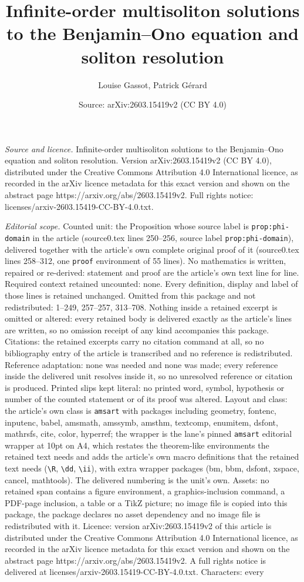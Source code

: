 \documentclass[10pt,a4paper]{amsart}
\title[Infinite-order multisoliton solutions to the Benjamin--Ono e]{Infinite-order multisoliton solutions to the Benjamin--Ono equation and soliton resolution}
\author{Louise Gassot, Patrick G\'erard}
\date{Source: arXiv:2603.15419v2 (CC BY 4.0)}
\begin{document}
\maketitle

\noindent\emph{Source and licence.} Infinite-order multisoliton solutions to the Benjamin--Ono equation and soliton resolution. Version arXiv:2603.15419v2 (CC BY 4.0), distributed under the Creative Commons Attribution 4.0 International licence, as recorded in the arXiv licence metadata for this exact version and shown on the abstract page https://arxiv.org/abs/2603.15419v2. Full rights notice: licenses/arxiv-2603.15419-CC-BY-4.0.txt.\par\smallskip

\noindent\textit{Editorial scope.} Counted unit: the Proposition whose source label is \texttt{prop:phi-domain} in the article (source0.tex lines 250--256, source label \texttt{prop:phi-domain}), delivered together with the article's own complete original proof of it (source0.tex lines 258--312, one \texttt{proof} environment of 55 lines). No mathematics is written, repaired or re-derived: statement and proof are the article's own text line for line. Required context retained uncounted: none. Every definition, display and label of those lines is retained unchanged. Omitted from this package and not redistributed: 1--249, 257--257, 313--708. Nothing inside a retained excerpt is omitted or altered: every retained body is delivered exactly as the article's lines are written, so no omission receipt of any kind accompanies this package. Citations: the retained excerpts carry no citation command at all, so no bibliography entry of the article is transcribed and no reference is redistributed. Reference adaptation: none was needed and none was made; every reference inside the delivered unit resolves inside it, so no unresolved reference or citation is produced. Printed slips kept literal: no printed word, symbol, hypothesis or number of the counted statement or of its proof was altered. Layout and class: the article's own class is \texttt{amsart} with packages including geometry, fontenc, inputenc, babel, amsmath, amssymb, amsthm, textcomp, enumitem, dsfont, mathrsfs, cite, color, hyperref; the wrapper is the lane's pinned \texttt{amsart} editorial wrapper at 10pt on A4, which restates the theorem-like environments the retained text needs and adds the article's own macro definitions that the retained text needs (\texttt{\textbackslash R}, \texttt{\textbackslash dd}, \texttt{\textbackslash ii}), with extra wrapper packages (bm, bbm, dsfont, xspace, cancel, mathtools). The delivered numbering is the unit's own. Assets: no retained span contains a figure environment, a graphics-inclusion command, a PDF-page inclusion, a table or a TikZ picture; no image file is copied into this package, the package declares no asset dependency and no image file is redistributed with it. Licence: version arXiv:2603.15419v2 of this article is distributed under the Creative Commons Attribution 4.0 International licence, as recorded in the arXiv licence metadata for this exact version and shown on the abstract page https://arxiv.org/abs/2603.15419v2. A full rights notice is delivered at licenses/arxiv-2603.15419-CC-BY-4.0.txt. Characters: every 
\end{document}
